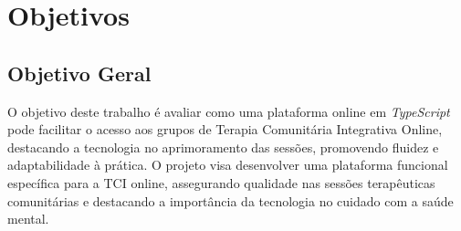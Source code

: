 \chapter*[Objetivos]{Objetivos}
\section*{Objetivo Geral}
O objetivo deste trabalho é avaliar como uma plataforma online em \textit{TypeScript} pode facilitar o acesso aos grupos de Terapia Comunitária Integrativa Online, destacando a tecnologia no aprimoramento das sessões, promovendo fluidez e adaptabilidade à prática. O projeto visa desenvolver uma plataforma funcional específica para a TCI online, assegurando qualidade nas sessões terapêuticas comunitárias e destacando a importância da tecnologia no cuidado com a saúde mental.



